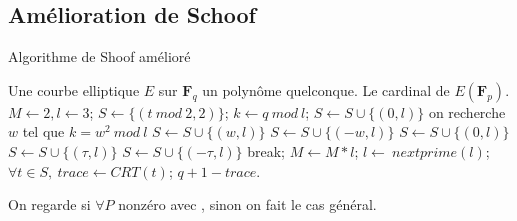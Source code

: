 \documentclass[french, lmodern]{beamer}
\newcommand\fq{\mathbf{F}_{q}}
\begin{document}
\subsection{Amélioration de Schoof}
\begin{frame}
\transwipe
\begin{algorithm}[H]
\caption{Algorithme de Shoof amélioré}
\label{schoof2}
\tiny \begin{algorithmic} 
\REQUIRE Une courbe elliptique $E$ sur $\fq$ un polynôme quelconque.
\ENSURE Le cardinal de $E(\mathbf{F}_{p})$.
\STATE $M\leftarrow 2, l\leftarrow 3$;
\STATE $S\leftarrow \{(t\ mod\ 2, 2)\}$; 
    \STATE $k\leftarrow q\ mod\ l$;	
            \STATE $S\leftarrow S\cup \{(0, l)\}$
            \ELSE
                \STATE on recherche $w$ tel que $k=w^{2}\ mod\ l$
                    \STATE $S\leftarrow S\cup \{(w, l)\}$ \OR $S\leftarrow S\cup \{(-w, l)\}$ 
                \ELSE
                    \STATE $S\leftarrow S\cup \{(0, l)\}$
                \ENDIF
            \ENDIF
    \ELSE
                \STATE $S\leftarrow S\cup \{(\tau, l)\}$ \OR $S\leftarrow S\cup \{(-\tau, l)\}$ 
                \STATE break;
            \ENDIF
        \ENDFOR
    \ENDIF
    \STATE $M\leftarrow M*l$;
    \STATE $l\leftarrow\ nextprime(l)$; 	
\ENDWHILE
\STATE $\forall t\in S,\ trace\leftarrow CRT(t)$; 
\RETURN $q + 1 - trace$.
\end{algorithmic}
\end{algorithm}
\end{frame}



\begin{frame}
\transwipe
On regarde si $\forall P$ nonzéro avec , sinon on fait le cas général.

\end{frame}
\end{document}
